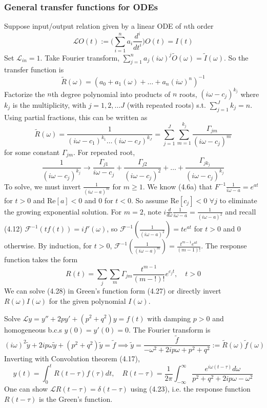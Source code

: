\documentclass[a4paper]{article}
\begin{document}
\subsubsection*{General transfer functions for ODEs}
Suppose input/output relation given by a linear ODE of $n$th order
\begin{equation}
    \mathcal{L}O(t):=\bigg(\sum_{i=1}^na_i\frac{d^i}{dt^i}\bigg)O(t)=I(t)\tag{4.28}
\end{equation}
Set $\mathcal{L}_{in}=1$. Take Fourier transform, $\sum_{j=1}^na_j(i\omega)^j\tilde{O}(\omega)=\tilde{I}(\omega)$. So the transfer function is
\begin{equation}
    \tilde{R}(\omega)=(a_0+a_1(\omega)+\dots+a_n(i\omega)^n)^{-1}\tag{4.29}
\end{equation}
Factorize the $n$th degree polynomial into products of $n$ roots, $(i\omega-c_j)^{k_j}$ where $k_j$ is the multiplicity, with $j=1,2,\dots J$ (with repeated roots) s.t. $\sum_{j=1}^Jk_j=n$. Using partial fractions, this can be written as
\begin{equation}
    \tilde{R}(\omega)=\frac{1}{(i\omega-c_1)^{k_1}\dots (i\omega-c_J)^{k_J}}=\sum_{j=1}^J\sum_{m=1}^{k_j}\frac{\Gamma_{jm}}{(i\omega-c_j)^m}\tag{4.30}
\end{equation}
for some constant $\Gamma_{jm}$. For repeated root,
$$\frac{1}{(i\omega-c_j)^{k_j}}\rightarrow\frac{\Gamma_{j1}}{i\omega-c_j}+\frac{\Gamma_{j2}}{(i\omega-c_j)^2}+\dots+\frac{\Gamma_{jk_j}}{(i\omega-c_j)^{k_j}}$$
To solve, we must invert $\frac{1}{(i\omega-a)^m}$ for $m\geq1$. We know (4.6a) that $F^{-1}\frac{1}{i\omega -a}=e^{at}$ for $t>0$ and $\text{Re}[a]<0$ and 0 for $t<0$. So assume $\text{Re}[c_j]<0$ $\forall j$ to eliminate the growing exponential solution. For $m=2$, note $i\frac{d}{d\omega}\frac{1}{i\omega -a}=\frac{1}{(i\omega-a)^2}$ and recall (4.12) $\mathcal{F}^{-1}(tf(t))=if'(\omega)$, so $\mathcal{F}^{-1}(\frac{1}{(i\omega-a)^2})=te^{at}$ for $t>0$ and 0 otherwise. By induction, for $t>0$, $\mathcal{F}^{-1}(\frac{1}{(i\omega-a)^m})=\frac{t^{m-1}e^{at}}{(m-1)!}$. The response function takes the form
\begin{equation}
    R(t)=\sum_j\sum_m\Gamma_{jm}\frac{t^{m-1}}{(m-!)!}e^{c_jt},\quad t>0\tag{4.31}
\end{equation}
We can solve (4.28) in Green's function form (4.27) or directly invert $R(\omega)I(\omega)$ for the given polynomial $I(\omega)$.
\begin{eg}
Solve $\mathcal{L}y=y''+2py'+(p^2+q^2)y=f(t)$ with damping $p>0$ and homogeneous b.c.s $y(0)=y'(0)=0$. The Fourier transform is
$$(i\omega)^2\tilde{y}+2ip\omega\tilde{y}+(p^2+q^2)\tilde{y}=\tilde{f}\implies\tilde{y}=\frac{\tilde{f}}{-\omega^2+2ip\omega+p^2+q^2}:=\tilde{R}(\omega)\tilde{f}(\omega)$$
Inverting with Convolution theorem (4.17),
$$y(t)=\int_0^tR(t-\tau)f(\tau)dt,\quad R(t-\tau)=\frac{1}{2\pi}\int_{-\infty}^\infty\frac{e^{i\omega(t-\tau)}d\omega}{p^2+q^2+2ip\omega-\omega^2}$$
One can show $\mathcal{L}R(t-\tau)=\delta(t-\tau)$ using (4.23), i.e. the response function $R(t-\tau)$ is the Green's function.
\end{eg}
\newpage
\end{document}
